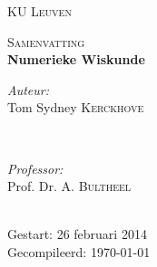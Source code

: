 \begin{titlepage}
\thispagestyle{empty}
\newcommand{\HRule}{\rule{\linewidth}{0.5mm}}
\center
\textsc{\LARGE KU Leuven}\\[1.5cm]
\vfill

\textsc{\large Samenvatting}\\[0.5cm]

{ \Huge \bfseries Numerieke Wiskunde}\\[0.4cm]

\vfill

\begin{minipage}{0.4\textwidth}
\begin{flushleft} \large
\emph{Auteur:}\\
Tom Sydney \textsc{Kerckhove}
\end{flushleft}
\end{minipage}
~
\begin{minipage}{0.4\textwidth}
\begin{flushright} \large
\emph{Professor:} \\
Prof. Dr. A. \textsc{Bultheel}\\
\end{flushright}
\end{minipage}\\[4cm]

{\large 
 Gestart: 26 februari 2014\\
 Gecompileerd: \today}\\[3cm]
\vfill

\end{titlepage}